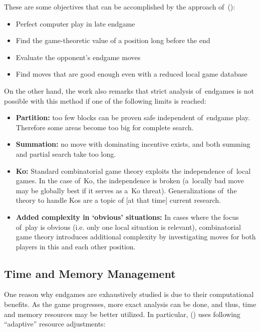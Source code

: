 These are some objectives that can be accomplished by the approach of~(\cite{Muller1995computer}):
\begin{itemize}
  \item Perfect computer play in late endgame
  \item Find the game-theoretic value of a position long before the end
  \item Evaluate the opponent’s endgame moves
  \item Find moves that are good enough even with a reduced local game database
\end{itemize}
On the other hand, the work also remarks that strict analysis of~endgames is not possible with this method if one of the following limits is reached:
\begin{itemize}
  \item \textbf{Partition:}
    too few blocks can be proven safe independent of~endgame play.
    Therefore some areas become too big for complete search.
  \item \textbf{Summation:}
    no move with dominating incentive exists, and both summing and partial search take too long.
  \item \textbf{Ko:}
    Standard combinatorial game theory exploits the independence of~local games.
    In the case of~Ko, the independence is broken (a~locally bad move may be globally best if it serves as a~Ko threat).
    Generalizations of~the theory to handle Kos are a topic of [at that time] current research.
  \item \textbf{Added complexity in ‘obvious’ situations:}
    In cases where the focus of~play is obvious (i.e. only one local situation is relevant), combinatorial game theory introduces additional complexity by investigating moves for both players in this and each other position.
\end{itemize}

\subsection{Time and Memory Management}

One reason why endgames are exhaustively studied is due to their computational benefits.
As the game progresses, more exact analysis can be done, and thus, time and memory resources may be better utilized.
In particular, (\cite{Muller1995computer}) uses following ``adaptive'' resource adjustments:

